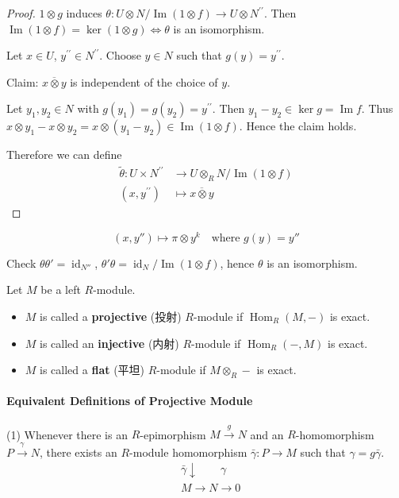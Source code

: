 \documentclass[11pt, a4paper]{report}
\begin{document}
\begin{proof}
$1 \otimes g$ induces $\theta: U \otimes N / \operatorname{Im}(1 \otimes f) \rightarrow U \otimes N^{\prime \prime}$. Then $\operatorname{Im}(1 \otimes f)=\operatorname{ker}(1 \otimes g) \Leftrightarrow \theta$ is an isomorphism.

Let $x \in U$, $y^{\prime \prime} \in N^{\prime \prime}$. Choose $y \in N$ such that $g(y)=y^{\prime \prime}$.

Claim: $\overline{x \otimes y}$ is independent of the choice of $y$.

Let $y_{1}, y_{2} \in N$ with $g\left(y_{1}\right)=g\left(y_{2}\right)=y^{\prime \prime}$. Then $y_{1}-y_{2} \in \operatorname{ker} g=\operatorname{Im} f$. Thus $x \otimes y_{1}-x \otimes y_{2}=x \otimes\left(y_{1}-y_{2}\right) \in \operatorname{Im}(1 \otimes f)$. Hence the claim holds.

Therefore we can define
\begin{align*}
\tilde{\theta}: U \times N^{\prime \prime} & \rightarrow U \otimes_{R} N / \operatorname{Im}(1 \otimes f) \\
\left(x, y^{\prime \prime}\right) & \mapsto \overline{x \otimes y}
\end{align*}
\end{proof}
\[
(x, y'') \mapsto \pi \otimes y^{k} \quad \text{where } g(y)=y''
\]

Check $\theta\theta'=\operatorname{id}_{N''}$, $\theta'\theta=\operatorname{id}_{N}/\operatorname{Im}(1 \otimes f)$, hence $\theta$ is an isomorphism.


\begin{definition}
Let $M$ be a left $R$-module.
\begin{itemize}
\item $M$ is called a \textbf{projective} (投射) $R$-module if $\operatorname{Hom}_{R}(M, -)$ is exact.
\item $M$ is called an \textbf{injective} (内射) $R$-module if $\operatorname{Hom}_{R}(-, M)$ is exact.
\item $M$ is called a \textbf{flat} (平坦) $R$-module if $M \otimes_{R} -$ is exact.
\end{itemize}
\end{definition}

\paragraph{Equivalent Definitions of Projective Module}

(1) Whenever there is an $R$-epimorphism $M \xrightarrow{g} N$ and an $R$-homomorphism $P \xrightarrow{\gamma} N$, there exists an $R$-module homomorphism $\bar{\gamma}\colon P \to M$ such that $\gamma=g\bar{\gamma}$.
\[
\begin{aligned}
& \bar{\gamma} \downarrow \quad \quad \gamma \\
& M \longrightarrow N \longrightarrow 0
\end{aligned}
\]
\end{document}

